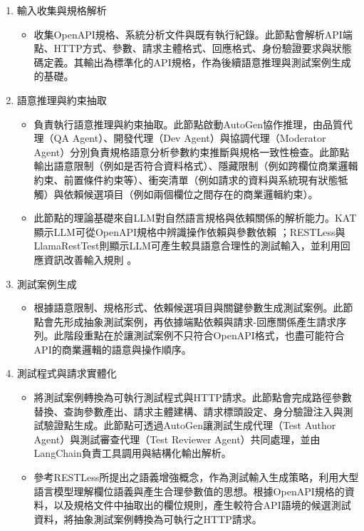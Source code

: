 \begin{ZhChapter}
\begin{enumerate}
  \item 輸入收集與規格解析
  \begin{itemize}
    \item 收集OpenAPI規格、系統分析文件與既有執行紀錄。此節點會解析API端點、HTTP方式、參數、請求主體格式、回應格式、身份驗證要求與狀態碼定義。其輸出為標準化的API規格，作為後續語意推理與測試案例生成的基礎。
  \end{itemize}
  \item 語意推理與約束抽取
  \begin{itemize}
    \item 負責執行語意推理與約束抽取。此節點啟動AutoGen協作推理，由品質代理（QA Agent）、開發代理（Dev Agent）與協調代理（Moderator Agent）分別負責規格語意分析參數約束推斷與規格一致性檢查。此節點輸出語意限制（例如是否符合資料格式）、隱藏限制（例如跨欄位商業邏輯約束、前置條件約束等）、衝突清單（例如請求的資料與系統現有狀態牴觸）與依賴候選項目（例如兩個欄位之間存在的商業邏輯約束）。
    \item 此節點的理論基礎來自LLM對自然語言規格與依賴關係的解析能力。KAT顯示LLM可從OpenAPI規格中辨識操作依賴與參數依賴 \parencite{Nguyen2024KAT}；RESTLess與LlamaRestTest則顯示LLM可產生較具語意合理性的測試輸入，並利用回應資訊改善輸入規則 \parencite{Zheng2024RESTLess, Kim2025LlamaRestTest}。
  \end{itemize}
  \item 測試案例生成
  \begin{itemize}
    \item 根據語意限制、規格形式、依賴候選項目與關鍵參數生成測試案例。此節點會先形成抽象測試案例，再依據端點依賴與請求-回應關係產生請求序列。此階段重點在於讓測試案例不只符合OpenAPI格式，也盡可能符合API的商業邏輯的語意與操作順序。
  \end{itemize}
  \item 測試程式與請求實體化
  \begin{itemize}
    \item 將測試案例轉換為可執行測試程式與HTTP請求。此節點會完成路徑參數替換、查詢參數產出、請求主體建構、請求標頭設定、身分驗證注入與測試驗證點生成。此節點可透過AutoGen讓測試生成代理（Test Author Agent）與測試審查代理（Test Reviewer Agent）共同處理，並由LangChain負責工具調用與結構化輸出解析。
    \item 參考RESTLess所提出之語義增強概念，作為測試輸入生成策略，利用大型語言模型理解欄位語義與產生合理參數值的思想。根據OpenAPI規格的資料，以及規格文件中抽取出的欄位規則，產生較符合API語境的候選測試資料，將抽象測試案例轉換為可執行之HTTP請求。

\end{itemize}
\end{enumerate}
\end{ZhChapter}
